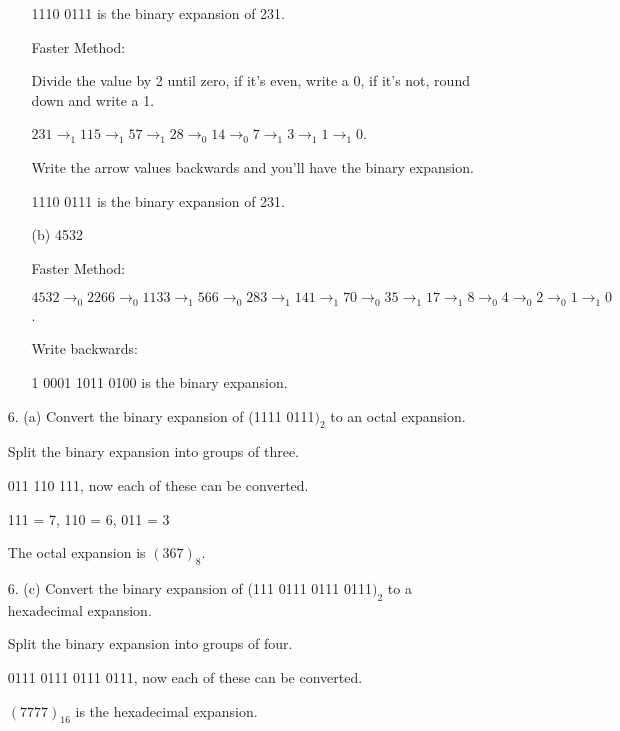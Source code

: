 \documentclass[12pt]{article}
\newcommand\bufsub{\vspace{1.0in}}
\newenvironment{answer}{\larger[2]}{}
\begin{document}
\begin{enumerate}
\begin{enumerate}
    1110 0111 is the binary expansion of 231.

    Faster Method:

    Divide the value by 2 until zero, if it's even, write a 0, if it's not, round down and write a 1.

    $231 \to_{1} 115 \to_{1} 57 \to_{1} 28 \to_{0} 14 \to_{0} 7 \to_{1} 3 \to_{1} 1 \to_{1} 0$.

    Write the arrow values backwards and you'll have the binary expansion.

    1110 0111 is the binary expansion of 231.
    
    \item[(b)] 4532
    
    Faster Method:

    $4532 \to_{0} 2266 \to_{0} 1133 \to_{1} 566 \to_{0} 283 \to_{1} 141 \to_{1} 70 \to_{0} 35 \to_{1} 17 \to_{1} 8 \to_{0} 4 \to_{0} 2 \to_{0} 1 \to_{1} 0$. 

    Write backwards:

    1 0001 1011 0100 is the binary expansion.
    
\end{enumerate}
\bufsub


\item[6. (a)] Convert the binary expansion of (1111 0111$)_{2}$ to an octal expansion.

\begin{answer}
    Split the binary expansion into groups of three.

    011 110 111, now each of these can be converted.

    111 = 7, 110 = 6, 011 = 3

    The octal expansion is $(367)_8$.
\end{answer}
\bufsub


\item[6. (c)] Convert the binary expansion of (111 0111 0111 0111$)_2$ to a hexadecimal expansion.

\begin{answer}
    Split the binary expansion into groups of four.

    0111 0111 0111 0111, now each of these can be converted.

    $(7777)_{16}$ is the hexadecimal expansion.
\end{answer}
\bufsub



\end{enumerate}
\end{document}
